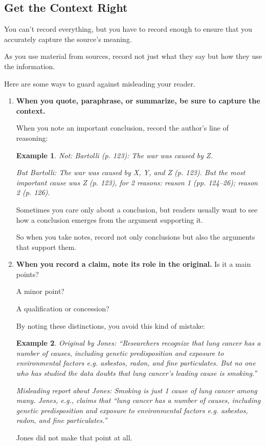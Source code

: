 \documentclass[oneside]{book}
\numberwithin{equation}{section}
\newtheorem{example}{Example}[section]
\begin{document}
\subsection{Get the Context Right}
You can't record everything, but you have to record enough to ensure that you accurately capture the source's meaning.

As you use material from sources, record not just what they say but how they use the information.

Here are some ways to guard against misleading your reader.
\begin{enumerate}
    \item \textbf{When you quote, paraphrase, or summarize, be sure to capture the context.}
    
    When you note an important conclusion, record the author's line of reasoning:
    \begin{example}
        Not: Bartolli (p. 123): The war was caused by Z.
        
        But Bartolli: The war was caused by X, Y, and Z (p. 123). But
the most important cause was Z (p. 123), for 2 reasons: reason
1 (pp. 124--26); reason 2 (p. 126).
    \end{example}
    Sometimes you care only about a conclusion, but readers usually want to see how a conclusion emerges from the argument supporting it.
    
    So when you take notes, record not only conclusions but also the arguments that support them.
    \item \textbf{When you record a claim, note its role in the original.} Is it a main points?
    
    A minor point?
    
    A qualification or concession?
    
    By noting these distinctions, you avoid this kind of mistake:
    \begin{example}
        Original by Jones: ``Researchers recognize that lung cancer has a number of causes, including genetic predisposition and exposure to environmental factors e.g. asbestos, radon, and fine particulates. But no one who has studied the data doubts that lung cancer's leading cause is smoking.''
        
        Misleading report about Jones: Smoking is just 1 cause of lung cancer among many. Jones, e.g., claims that ``lung cancer has a number of causes, including genetic predisposition and exposure to environmental factors e.g. asbestos, radon, and fine particulates.''
    \end{example}
    Jones did not make that point at all.
    

\end{enumerate}
\end{document}
